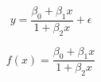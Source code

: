 \documentclass[12pt]{article}
\begin{document}
\pagestyle{empty}
\Large
{}
\pagecolor{ehandbook}

\boldmath
\[
y = \frac{\beta_0 + \beta_1 x}{1 + \beta_2 x} + \epsilon
\]

\[
f(x) = \frac{\beta_0 + \beta_1 x}{1 + \beta_2 x}
\]
\end{document}
